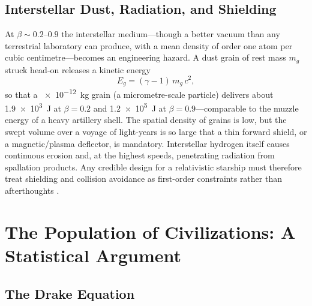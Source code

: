 \documentclass[12pt,a4paper]{article}
\begin{document}
\subsection{Interstellar Dust, Radiation, and Shielding}

At $\beta \sim 0.2$--$0.9$ the interstellar medium---though a better vacuum
than any terrestrial laboratory can produce, with a mean density of order one
atom per cubic centimetre---becomes an engineering hazard. A dust grain of rest
mass $m_g$ struck head-on releases a kinetic energy
\begin{equation}
  E_g = (\gamma - 1)\,m_g\,c^2,
  \label{eq:dust_impact}
\end{equation}
so that a \SI{e-12}{\kilo\gram} grain (a micrometre-scale particle) delivers
about \SI{1.9e3}{\joule} at $\beta = 0.2$ and \SI{1.2e5}{\joule} at
$\beta = 0.9$---comparable to the muzzle energy of a heavy artillery shell.
The spatial density of grains is low, but the swept volume over a voyage of
light-years is so large that a thin forward shield, or a magnetic/plasma
deflector, is mandatory. Interstellar hydrogen itself causes continuous
erosion and, at the highest speeds, penetrating radiation from spallation
products. Any credible design for a relativistic starship must therefore treat
shielding and collision avoidance as first-order constraints rather than
afterthoughts \citep{Dyson1968}.

\section{The Population of Civilizations: A Statistical Argument}
\label{sec:civilizations}

\subsection{The Drake Equation}
\end{document}
